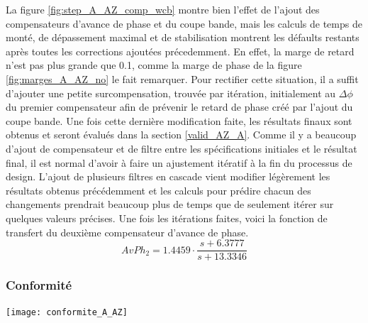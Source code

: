 \documentclass{udes_rapport} %
\begin{document}
La figure \ref{fig:step_A_AZ_comp_wcb} montre bien l'effet de l'ajout des compensateurs d'avance de phase et du coupe bande, mais les calculs de temps de monté, de dépassement maximal et de stabilisation montrent les défaults restants après toutes les corrections ajoutées précedemment. En effet, la marge de retard n'est pas plus grande que 0.1, comme la marge de phase de la figure \ref{fig:marges_A_AZ_no} le fait remarquer. Pour rectifier cette situation, il a suffit d'ajouter une petite surcompensation, trouvée par itération, initialement au $\Delta \phi$ du premier compensateur afin de prévenir le retard de phase créé par l'ajout du coupe bande. Une fois cette dernière modification faite, les résultats finaux sont obtenus et seront évalués dans la section \ref{valid_AZ_A}. Comme il y a beaucoup d'ajout de compensateur et de filtre entre les spécifications initiales et le résultat final, il est normal d'avoir à faire un ajustement itératif à la fin du processus de design. L'ajout de plusieurs filtres en cascade vient modifier légèrement les résultats obtenus précédemment et les calculs pour prédire chacun des changements prendrait beaucoup plus de temps que de seulement itérer sur quelques valeurs précises. Une fois les itérations faites, voici la fonction de transfert du deuxième compensateur d'avance de phase.
\[ AvPh_2 =  1.4459 \cdot \frac{s+6.3777}{s+13.3346}\]


\newpage
\subsubsection{Conformité}
\begin{center}
  \label{tab:conformite_A_AZ}
  \texttt{[image: conformite\_A\_AZ]}
\end{center}
\end{document}
